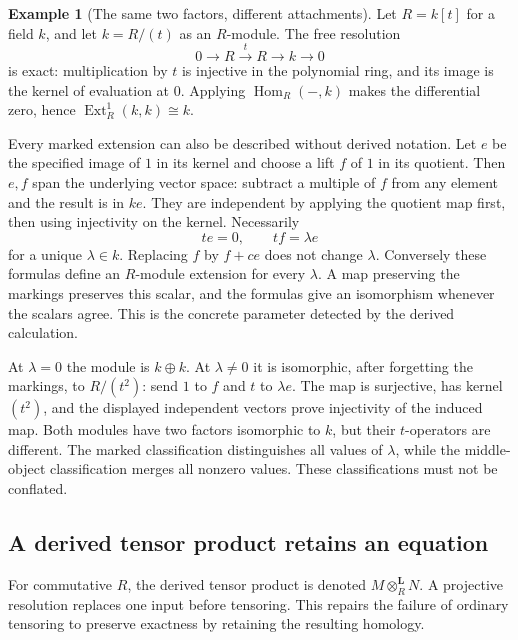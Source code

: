 \documentclass[11pt]{article}
\theoremstyle{definition}
\newtheorem{example}[theorem]{Example}
\theoremstyle{remark}\newtheorem{remark}[theorem]{Remark}
\begin{document}
\begin{example}[The same two factors, different attachments]
\label{t:dual-number-extension}
Let $R=k[t]$ for a field $k$, and let $k=R/(t)$ as an $R$-module.
The free resolution
\[
 0\longrightarrow R\xrightarrow{\,t\,}R\longrightarrow k
 \longrightarrow0
\]
is exact: multiplication by $t$ is injective in the polynomial ring,
and its image is the kernel of evaluation at $0$.  Applying
$\operatorname{Hom}_R(-,k)$ makes the differential zero, hence
$\operatorname{Ext}^1_R(k,k)\cong k$.

Every marked extension can also be described without derived notation.
Let $e$ be the specified image of $1$ in its kernel and choose a lift $f$
of $1$ in its quotient.  Then $e,f$ span the underlying vector space:
subtract a multiple of $f$ from any element and the result is in $ke$.
They are independent by applying the quotient map first, then using
injectivity on the kernel.  Necessarily
\[
 te=0,\qquad tf=\lambda e
\]
for a unique $\lambda\in k$.  Replacing $f$ by $f+ce$ does not change
$\lambda$.  Conversely these formulas define an $R$-module extension
for every $\lambda$.  A map preserving the markings preserves this
scalar, and the formulas give an isomorphism whenever the scalars agree.
This is the concrete parameter detected by the derived calculation.

At $\lambda=0$ the module is $k\oplus k$.  At $\lambda\neq0$ it is
isomorphic, after forgetting the markings, to $R/(t^2)$: send $1$ to
$f$ and $t$ to $\lambda e$.  The map is surjective, has kernel $(t^2)$,
and the displayed independent vectors prove injectivity of the induced
map.  Both modules have two factors isomorphic to $k$, but their
$t$-operators are different.  The marked classification distinguishes
all values of $\lambda$, while the middle-object classification merges
all nonzero values.  These classifications must not be conflated.
\end{example}

\subsection{A derived tensor product retains an equation}

For commutative $R$, the derived tensor product is denoted
$M\otimes_R^{\mathbf L}N$.  A projective resolution replaces one input
before tensoring.  This repairs the failure of ordinary tensoring to
preserve exactness by retaining the resulting homology.
\end{document}
